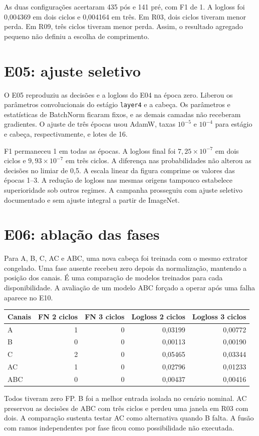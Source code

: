 \documentclass[11pt,a4paper]{article}
\newcommand{\codigo}[1]{\texttt{#1}}
\begin{document}
As duas configurações acertaram 435 pós e 141 pré, com F1 de 1. A logloss foi 0,004369 em dois ciclos e 0,004164 em três. Em R03, dois ciclos tiveram menor perda. Em R09, três ciclos tiveram menor perda. Assim, o resultado agregado pequeno não definiu a escolha de comprimento.

\section{E05: ajuste seletivo}
O E05 reproduziu as decisões e a logloss do E04 na época zero. Liberou os parâmetros convolucionais do estágio \codigo{layer4} e a cabeça. Os parâmetros e estatísticas de BatchNorm ficaram fixos, e as demais camadas não receberam gradientes. O ajuste de três épocas usou AdamW, taxas $10^{-5}$ e $10^{-4}$ para estágio e cabeça, respectivamente, e lotes de 16.

F1 permaneceu 1 em todas as épocas. A logloss final foi $7{,}25\times10^{-7}$ em dois ciclos e $9{,}93\times10^{-7}$ em três ciclos. A diferença nas probabilidades não alterou as decisões no limiar de 0,5. A escala linear da figura comprime os valores das épocas 1--3. A redução de logloss nas mesmas origens tampouco estabelece superioridade sob outros regimes. A campanha prosseguiu com ajuste seletivo documentado e sem ajuste integral a partir de ImageNet.

\section{E06: ablação das fases}
Para A, B, C, AC e ABC, uma nova cabeça foi treinada com o mesmo extrator congelado. Uma fase ausente recebeu zero depois da normalização, mantendo a posição dos canais. É uma comparação de modelos treinados para cada disponibilidade. A avaliação de um modelo ABC forçado a operar após uma falha aparece no E10.
\begin{center}
\begin{tabular}{@{}lrrrr@{}}\toprule
Canais & FN 2 ciclos & FN 3 ciclos & Logloss 2 ciclos & Logloss 3 ciclos\\\midrule
A & 1 & 0 & 0,03199 & 0,00772\\
B & 0 & 0 & 0,00113 & 0,00190\\
C & 2 & 0 & 0,05465 & 0,03344\\
AC & 1 & 0 & 0,02796 & 0,01233\\
ABC & 0 & 0 & 0,00437 & 0,00416\\\bottomrule
\end{tabular}
\end{center}
Todos tiveram zero FP. B foi a melhor entrada isolada no cenário nominal. AC preservou as decisões de ABC com três ciclos e perdeu uma janela em R03 com dois. A comparação sustenta testar AC como alternativa quando B falta. A fusão com ramos independentes por fase ficou como possibilidade não executada.
\end{document}
